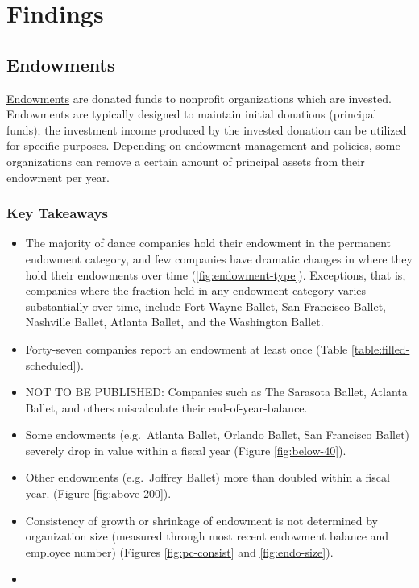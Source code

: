 \documentclass[Dance Data
Project,article,submit,moreauthors,pdftex]{mdpi}
\providecommand{\tightlist}{%
  \setlength{\itemsep}{0pt}\setlength{\parskip}{0pt}}
\begin{document}
\hypertarget{findings}{%
\section{Findings}\label{findings}}

\hypertarget{endowments}{%
\subsection{Endowments}\label{endowments}}

\href{https://www.investopedia.com/terms/e/endowment.asp}{Endowments}
are donated funds to nonprofit organizations which are invested.
Endowments are typically designed to maintain initial donations
(principal funds); the investment income produced by the invested
donation can be utilized for specific purposes. Depending on endowment
management and policies, some organizations can remove a certain amount
of principal assets from their endowment per year.

\hypertarget{key-takeaways}{%
\subsubsection{Key Takeaways}\label{key-takeaways}}

\begin{itemize}
\tightlist
\item
  The majority of dance companies hold their endowment in the permanent
  endowment category, and few companies have dramatic changes in where
  they hold their endowments over time (\ref{fig:endowment-type}).
  Exceptions, that is, companies where the fraction held in any
  endowment category varies substantially over time, include Fort Wayne
  Ballet, San Francisco Ballet, Nashville Ballet, Atlanta Ballet, and
  the Washington Ballet.\\
\item
  Forty-seven companies report an endowment at least once (Table
  \ref{table:filled-scheduled}).\\
\item
  NOT TO BE PUBLISHED: Companies such as The Sarasota Ballet, Atlanta
  Ballet, and others miscalculate their end-of-year-balance.\\
\item
  Some endowments (e.g.~Atlanta Ballet, Orlando Ballet, San Francisco
  Ballet) severely drop in value within a fiscal year (Figure
  \ref{fig:below-40}).\\
\item
  Other endowments (e.g.~Joffrey Ballet) more than doubled within a
  fiscal year. (Figure \ref{fig:above-200}).\\
\item
  Consistency of growth or shrinkage of endowment is not determined by
  organization size (measured through most recent endowment balance and
  employee number) (Figures \ref{fig:pc-consist} and
  \ref{fig:endo-size}).\\
\item
\end{itemize}
\end{document}
